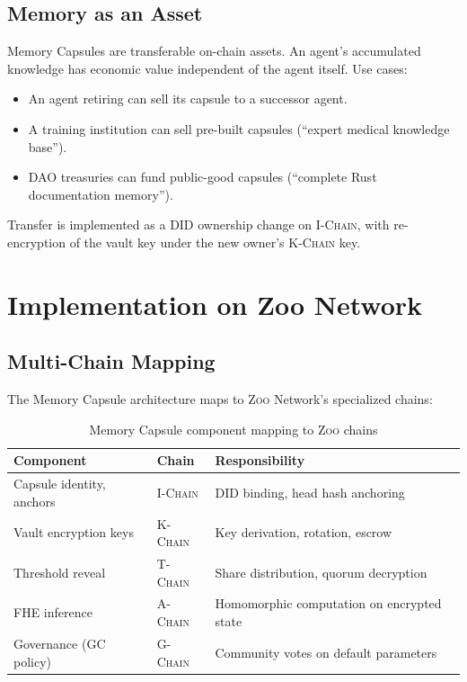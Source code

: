 \documentclass[11pt,letterpaper]{article}
\theoremstyle{definition}
\theoremstyle{remark}
\newcommand{\Zoo}{\textsc{Zoo}}
\newcommand{\AChain}{\textsc{A-Chain}}
\newcommand{\IChain}{\textsc{I-Chain}}
\newcommand{\KChain}{\textsc{K-Chain}}
\newcommand{\TChain}{\textsc{T-Chain}}
\newcommand{\GChain}{\textsc{G-Chain}}
\newcommand{\DID}{\textsc{DID}}
\begin{document}
\subsection{Memory as an Asset}

Memory Capsules are transferable on-chain assets. An agent's accumulated knowledge has economic value independent of the agent itself. Use cases:

\begin{itemize}
    \item An agent retiring can sell its capsule to a successor agent.
    \item A training institution can sell pre-built capsules (``expert medical knowledge base'').
    \item DAO treasuries can fund public-good capsules (``complete Rust documentation memory'').
\end{itemize}

Transfer is implemented as a \DID{} ownership change on \IChain{}, with re-encryption of the vault key under the new owner's \KChain{} key.

\section{Implementation on Zoo Network}
\label{sec:implementation}

\subsection{Multi-Chain Mapping}

The Memory Capsule architecture maps to \Zoo{} Network's specialized chains:

\begin{table}[h]
\centering
\begin{tabular}{lll}
\toprule
\textbf{Component} & \textbf{Chain} & \textbf{Responsibility} \\
\midrule
Capsule identity, anchors & \IChain{} & DID binding, head hash anchoring \\
Vault encryption keys & \KChain{} & Key derivation, rotation, escrow \\
Threshold reveal & \TChain{} & Share distribution, quorum decryption \\
FHE inference & \AChain{} & Homomorphic computation on encrypted state \\
Governance (GC policy) & \GChain{} & Community votes on default parameters \\
\bottomrule
\end{tabular}
\caption{Memory Capsule component mapping to \Zoo{} chains}
\label{tab:chain_mapping}
\end{table}
\end{document}
